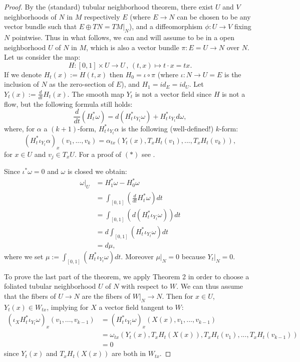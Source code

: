 \documentclass[a4paper,12pt,leqno]{article}
\begin{document}
\begin{proof}
By the (standard) tubular neighborhood theorem, there exist $U$ and $V$ neighborhoods of $N$ in $M$ respectively $E$ (where $E\rightarrow N$ 
can be chosen to be any vector bundle such that $E\oplus TN=TM|_N$), and a diffeomorphism $\phi: U\rightarrow V$ fixing 
$N$ pointwise. Thus in what follows, 
we can and will assume to be in a open neighborhood $U$ of $N$ in $M$, which is also a vector bundle $\pi: E=U\to N$ over $N$. Let us consider 
the map:
\begin{equation*}
H:[0,1]\times U\rightarrow U\, ,  \, (t,x)\mapsto t\cdot x =tx.
\end{equation*}
If we denote $H_t(x):=H(t,x)$ then $H_0=\iota\circ \pi$ (where 
$\iota:N\rightarrow U=E$ is the inclusion of $N$ as the zero-section of $E$), and $H_1=id_E=id_U$. Let 
$Y_t(x):=\frac{d}{dt} H_t(x)$. The smooth map $Y_t$ is not a vector field since 
$H$ is not a flow, but the following formula still holds:
\begin{equation*}\tag{*}
\frac{d}{dt}(H_t^*\omega)=d(H_t^*\iota_{Y_t}\omega)+H_t^*\iota_{Y_t}d\omega,
\end{equation*} 
where, for $\alpha$ a $(k{+}1)$-form, $H_t^*\iota_{Y_t}\alpha$ is the following (well-defined!) $k$-form:
\begin{equation*}
(H_t^*\iota_{Y_t}\alpha)_x(v_1,...,v_k)=\alpha_{tx}(Y_t(x),T_xH_t(v_1),...,T_xH_t(v_k)),
\end{equation*}
for $x\in U$ and $v_j \in T_xU$. For a proof of $(*)$ see \cite{guilstern}. 

Since $\iota^*\omega=0$ and $\omega$ is closed we obtain:
\begin{align*}
\omega|_U&=H_1^*\omega-H_0^*\omega \\
&=\int_{[0,1]}\left(\frac{d}{dt}H_t^*\omega\right)dt \\
&=\int_{[0,1]}(d(H_t^*\iota_{Y_t}\omega))dt \\
&=d\int_{[0,1]}(H_t^*\iota_{Y_t}\omega)dt \\
&=d\mu,
\end{align*}
where we set $\mu:=\int_{[0,1]}(H_t^*\iota_{Y_t}\omega)dt$. Moreover $\mu|_N=0$ because $Y_t|_N=0$. 

To prove the last part of the theorem, we apply Theorem 2 in order to choose a foliated tubular 
neighborhood $U$ of $N$ with respect to $W$.
We can thus assume that the fibers of $U\rightarrow N$ are the fibers of $W|_N\rightarrow N$. Then for 
$x\in U$, $Y_t(x)\in W_{tx}$, implying for $X$ a vector field tangent to $W$:
\begin{align*}
(\iota_XH_t^*\iota_{Y_t}\omega)_x(v_1,...,v_{k{-}1})&=(H_t^*\iota_{Y_t}\omega)_x(X(x),v_1,...,v_{k{-}1}) \\
&=\omega_{tx}(Y_t(x),T_xH_t(X(x)),T_xH_t(v_1),...,T_xH_t(v_{k-1})) \\
&=0
\end{align*}
since $Y_t(x)$ and $T_xH_t(X(x))$ are both in $W_{tx}$. 
\end{proof}






\end{document}
